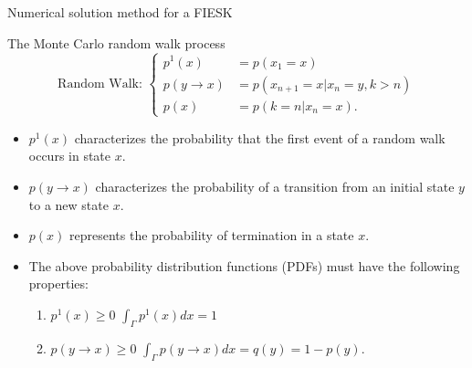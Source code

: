 \documentclass{beamer}
\begin{document}
\begin{frame}{Numerical solution method for a FIESK}

  \begin{beamerboxesrounded}{The Monte Carlo random walk process}
    \begin{equation*}
      \text{Random Walk: }
      \begin{cases}
        p^1(x) & = p(x_1 = x) \\
        p(y \to x) & = p(x_{n+1} = x | x_n = y, k > n)  \\
        p(x) & = p(k = n | x_n = x).
      \end{cases}
      \label{eq:mc_random_walk_pdfs}
    \end{equation*}
  \end{beamerboxesrounded}

  \begin{itemize}
    \item $p^1(x)$ characterizes the probability that the first event of a
      random walk occurs in state $x$.
    \item $p(y \to x)$ characterizes the probability of a transition from an
      initial state $y$ to a new state $x$.
    \item $p(x)$ represents the probability of termination in a state $x$.
    \item The above probability distribution functions (PDFs) must have
      the following properties:
      \medskip
      \begin{enumerate}
        \item $p^1(x) \geq 0$ \newline
          $\int_{\Gamma} p^1(x)dx = 1$
        \medskip
        \item $p(y \to x) \geq 0$ \newline
          $\int_{\Gamma} p(y \to x)dx = q(y) = 1 - p(y)$.
      \end{enumerate}
  \end{itemize}

\end{frame}
\end{document}

